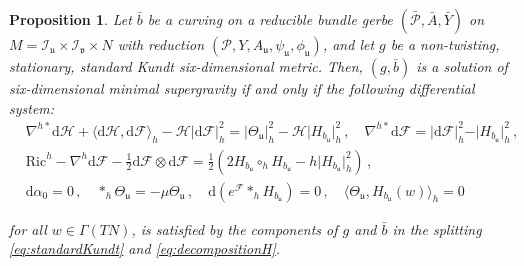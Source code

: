 \documentclass[10pt,a4paper,twoside,reqno]{amsart}
\theoremstyle{plain}
\newtheorem{prop}[thm]{Proposition}
\theoremstyle{definition}
\theoremstyle{remark}
\def\dd{\mathrm{d}}
\def\cH{\mathcal{H}}
\def\cI{\mathcal{I}}
\def\cP{\mathcal{P}}
\def\cP{\mathcal{P}}
\def\cF{\mathcal{F}}
\def\cH{\mathcal{H}}
\def\dd{\mathrm{d}}
\def\fru{\mathfrak{u}}
\def\frv{\mathfrak{v}}
\begin{document}
\begin{prop}
\label{prop:wavefrontreduction}
Let $\bar{b}$ be a curving on a reducible bundle gerbe $(\bar{\cP},\bar{A},\bar{Y})$ on $M = \cI_{\fru}\times \cI_{\frv}\times N$ with reduction $(\cP,Y,A_{\fru} , \psi_{\fru} , \phi_{\fru})$, and let $g$ be a non-twisting, stationary, standard Kundt six-dimensional metric. Then, $(g,\bar{b})$ is a solution of six-dimensional minimal supergravity if and only if the following differential system:
\begin{eqnarray}
& \nabla^{h\ast} \dd\cH + \langle \dd\cH, \dd\cF \rangle_h -   \cH \vert \dd\cF \vert^2_h  =   \vert\Theta_{\fru} \vert^2_h - \cH \vert H_{b_{\fru}} \vert^2_h\, , \quad  \nabla^{h\ast}\dd \cF   = \vert \dd\cF \vert^2_h -   \vert H_{b_{\fru}} \vert^2_h\, ,\label{eq:wavefront1}\\
& \mathrm{Ric}^h - \nabla^h \dd \cF - \frac{1}{2} \dd \cF \otimes \dd \cF = \frac{1}{2} (2H_{b_{\fru}}\circ_h H_{b_{\fru}} - h \vert H_{b_{\fru}} \vert^2_h )\, ,\label{eq:wavefront2}\\
& \dd\alpha_{0} = 0\, ,\quad \ast_h\Theta_{\fru} = -\mu \Theta_{\fru}\, , \quad \dd (e^{\cF} \ast_h H_{b_{\fru}}) = 0\, ,\quad \langle \Theta_{\fru} , H_{b_{\fru}}(w) \rangle_h = 0\label{eq:wavefront3}
\end{eqnarray}

\noindent
for all $w\in\Gamma(TN)$, is satisfied by the components of $g$ and $\bar{b}$ in the splitting \eqref{eq:standardKundt} and \eqref{eq:decompositionH}.
\end{prop}
\end{document}
